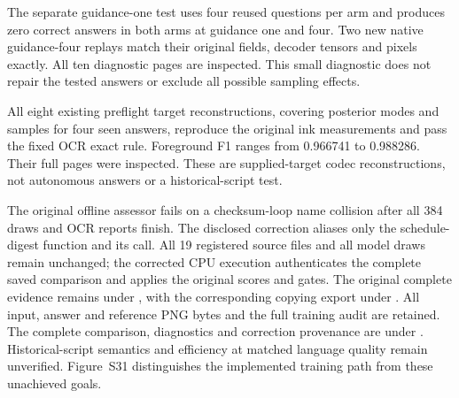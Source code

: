 \documentclass[10pt,a4paper]{article}
\begin{document}
The separate guidance-one test uses four reused questions per arm and produces
zero correct answers in both arms at guidance one and four. Two new native
guidance-four replays match their original fields, decoder tensors and pixels
exactly. All ten diagnostic pages are inspected. This small diagnostic does
not repair the tested answers or exclude all possible sampling effects.

All eight existing preflight target reconstructions, covering posterior modes
and samples for four seen answers, reproduce the original ink measurements
and pass the fixed OCR exact rule. Foreground F1 ranges from 0.966741 to
0.988286. Their full pages were inspected. These are supplied-target codec
reconstructions, not autonomous answers or a historical-script test.

The original offline assessor fails on a checksum-loop name collision after
all 384 draws and OCR reports finish. The disclosed correction aliases only
the schedule-digest function and its call. All 19 registered source files and
all model draws remain unchanged; the corrected CPU execution authenticates
the complete saved comparison and applies the original scores and gates.
The original complete evidence remains under
, with
the corresponding copying export under
.
All input, answer and reference PNG bytes and the full training audit are retained.
The complete comparison, diagnostics and correction provenance are under
.
Historical-script semantics and efficiency at matched language quality remain
unverified. Figure~S31 distinguishes the implemented training path from these
unachieved goals.


\clearpage
{}
\end{document}
